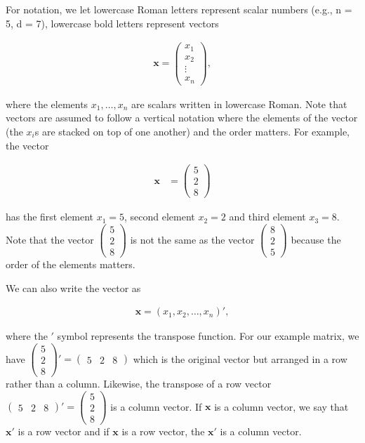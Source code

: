 \documentclass[
]{book}
\theoremstyle{definition}
\theoremstyle{definition}
\theoremstyle{definition}
\theoremstyle{remark}
\begin{document}
For notation, we let lowercase Roman letters represent scalar numbers (e.g., n = 5, d = 7), lowercase bold letters represent vectors

\[
\begin{aligned}
\textbf{x} = \begin{pmatrix}  x_1 \\ x_2 \\ \vdots \\ x_n \end{pmatrix},
\end{aligned}
\]

where the elements \(x_1, \ldots, x_n\) are scalars written in lowercase Roman. Note that vectors are assumed to follow a vertical notation where the elements of the vector (the \(x_i\)s are stacked on top of one another) and the order matters. For example, the vector

\[
\begin{aligned}
\mathbf{x} & = \begin{pmatrix} 5 \\ 2 \\ 8 \end{pmatrix}
\end{aligned}
\]

has the first element \(x_1 = 5\), second element \(x_2 = 2\) and third element \(x_3 = 8\). Note that the vector \(\begin{pmatrix} 5 \\ 2 \\ 8 \end{pmatrix}\) is not the same as the vector \(\begin{pmatrix} 8 \\ 2 \\ 5 \end{pmatrix}\) because the order of the elements matters.

We can also write the vector as

\[
\begin{aligned}
\textbf{x} = \left(  x_1, x_2, \ldots, x_n \right)',
\end{aligned}
\]

where the \('\) symbol represents the transpose function. For our example matrix, we have \(\begin{pmatrix} 5 \\ 2 \\ 8 \end{pmatrix}' = \begin{pmatrix} 5 & 2 & 8 \end{pmatrix}\) which is the original vector but arranged in a row rather than a column. Likewise, the transpose of a row vector \(\begin{pmatrix} 5 & 2 & 8 \end{pmatrix}' = \begin{pmatrix} 5 \\ 2 \\ 8 \end{pmatrix}\) is a column vector. If \(\mathbf{x}\) is a column vector, we say that \(\mathbf{x}'\) is a row vector and if \(\mathbf{x}\) is a row vector, the \(\mathbf{x}'\) is a column vector.
\end{document}
